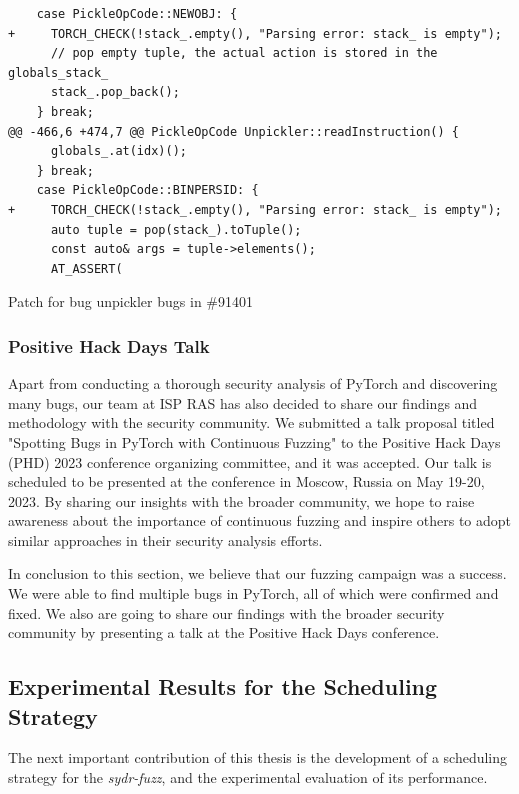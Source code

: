 \begin{code}
    \begin{verbatim}
    case PickleOpCode::NEWOBJ: {
+     TORCH_CHECK(!stack_.empty(), "Parsing error: stack_ is empty");
      // pop empty tuple, the actual action is stored in the globals_stack_
      stack_.pop_back();
    } break;
@@ -466,6 +474,7 @@ PickleOpCode Unpickler::readInstruction() {
      globals_.at(idx)();
    } break;
    case PickleOpCode::BINPERSID: {
+     TORCH_CHECK(!stack_.empty(), "Parsing error: stack_ is empty");
      auto tuple = pop(stack_).toTuple();
      const auto& args = tuple->elements();
      AT_ASSERT(
    \end{verbatim}
    \caption{Patch for bug unpickler bugs in \#91401}
    \label{listing:pytorch-bug-91401-patch}
\end{code}

\subsubsection{Positive Hack Days Talk}

Apart from conducting a thorough security analysis of PyTorch and discovering many bugs, our team at ISP RAS has also decided to share our findings and methodology with the security community. We submitted a talk proposal titled "Spotting Bugs in PyTorch with Continuous Fuzzing" to the Positive Hack Days (PHD) 2023 conference organizing committee, and it was accepted. Our talk is scheduled to be presented at the conference in Moscow, Russia on May 19-20, 2023. By sharing our insights with the broader community, we hope to raise awareness about the importance of continuous fuzzing and inspire others to adopt similar approaches in their security analysis efforts.

In conclusion to this section, we believe that our fuzzing campaign was a success. We were able to find multiple bugs in PyTorch, all of which were confirmed and fixed. We also are going to share our findings with the broader security community by presenting a talk at the Positive Hack Days conference.

\subsection{Experimental Results for the Scheduling Strategy} \label{results:symbolic-pointers-modeling-scheduling}

The next important contribution of this thesis is the development of a scheduling strategy for the \textit{sydr-fuzz}, and the experimental evaluation of its performance.

